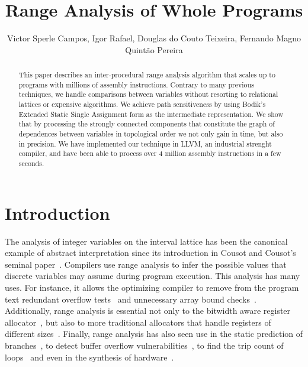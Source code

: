 \documentclass{llncs}
\begin{document}
\title {Range Analysis of Whole Programs}

\author{Victor Sperle Campos, Igor Rafael, Douglas do Couto Teixeira,
Fernando Magno Quint\~{a}o Pereira}



\maketitle

\begin{abstract}
This paper describes an inter-procedural range analysis algorithm that scales
up to programs with millions of assembly instructions.
Contrary to many previous techniques, we handle comparisons between variables
without resorting to relational lattices or expensive algorithms.
We achieve path sensitiveness by using Bodik's Extended Static Single
Assignment form as the intermediate representation.
We show that by processing the strongly connected components that constitute
the graph of dependences between variables in topological order we not only
gain in time, but also in precision.
We have implemented our technique in LLVM, an industrial strenght compiler,
and have been able to process over 4 million assembly instructions in a
few seconds.
\end{abstract}

\section{Introduction}
\label{sec:intro}

The analysis of integer variables on the interval lattice has been the
canonical example of abstract interpretation since its introduction in
Cousot and Cousot's seminal paper~\cite{Cousot77}.
Compilers use range analysis to infer the possible values that discrete
variables may assume during program execution.
This analysis has many uses.
For instance, it allows the optimizing compiler to remove from the program text
redundant overflow tests~\cite{Sol11} and unnecessary array bound
checks~\cite{Bodik00}.
Additionally, range analysis is essential not only to the bitwidth aware
register allocator~\cite{Barik06,Tallam03}, but also to more traditional
allocators that handle registers of different
sizes~\cite{Kong98,Pereira08,Scholz02}.
Finally, range analysis has also seen use in the static prediction of
branches~\cite{Patterson95}, to detect buffer overflow
vulnerabilities~\cite{Simon08,Wagner00}, to find the trip count of
loops~\cite{Lokuciejewski09}
and even in the synthesis of hardware~\cite{Cong05,Mahlke01}.
\end{document}
